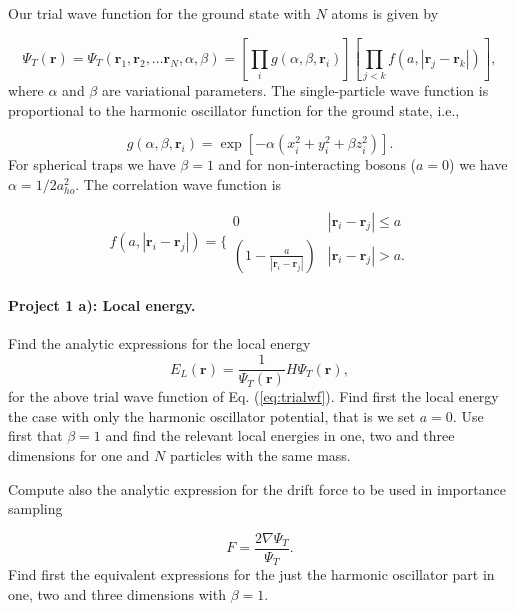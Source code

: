 \documentclass[%
oneside,                 %
final,                   %
10pt]{article}
\begin{document}
 Our trial wave function for the ground state with $N$ atoms is given by

\begin{equation}
 \Psi_T(\mathbf{r})=\Psi_T(\mathbf{r}_1, \mathbf{r}_2, \dots \mathbf{r}_N,\alpha,\beta)
 =\left[
    \prod_i g(\alpha,\beta,\mathbf{r}_i)
 \right]
 \left[
    \prod_{j<k}f(a,|\mathbf{r}_j-\mathbf{r}_k|)
 \right],
 \label{eq:trialwf}
 \end{equation}
 where $\alpha$ and $\beta$ are variational parameters. The
 single-particle wave function is proportional to the harmonic
 oscillator function for the ground state, i.e.,

\begin{equation}
    g(\alpha,\beta,\mathbf{r}_i)= \exp{[-\alpha(x_i^2+y_i^2+\beta z_i^2)]}.
 \end{equation}
 For spherical traps we have $\beta = 1$ and for non-interacting
 bosons ($a=0$) we have $\alpha = 1/2a_{ho}^2$.  The correlation wave
 function is

\begin{equation}
    f(a,|\mathbf{r}_i-\mathbf{r}_j|)=\Bigg\{
 \begin{array}{ll}
	 0 & {|\mathbf{r}_i-\mathbf{r}_j|} \leq {a}\\
	 (1-\frac{a}{|\mathbf{r}_i-\mathbf{r}_j|}) & {|\mathbf{r}_i-\mathbf{r}_j|} > {a}.
 \end{array}
 \end{equation}


\paragraph{Project 1 a): Local energy.}
Find the analytic expressions for the local energy
\begin{equation}
    E_L(\mathbf{r})=\frac{1}{\Psi_T(\mathbf{r})}H\Psi_T(\mathbf{r}),
    \label{eq:locale}
 \end{equation}
 for the above 
 trial wave function of Eq. (\ref{eq:trialwf}). 
Find first the local energy the case with only the harmonic oscillator potential, that is we set $a=0$.
Use first that $\beta =1$ and find the relevant local energies in one, two and three dimensions for one and
$N$ particles with the same mass. 

 Compute also the analytic expression for the drift force to be used in importance sampling

\begin{equation}
   F = \frac{2\nabla \Psi_T}{\Psi_T}.
 \end{equation}
Find first the equivalent expressions for the just the harmonic oscillator part in one, two and three dimensions
with $\beta=1$. 
\end{document}
